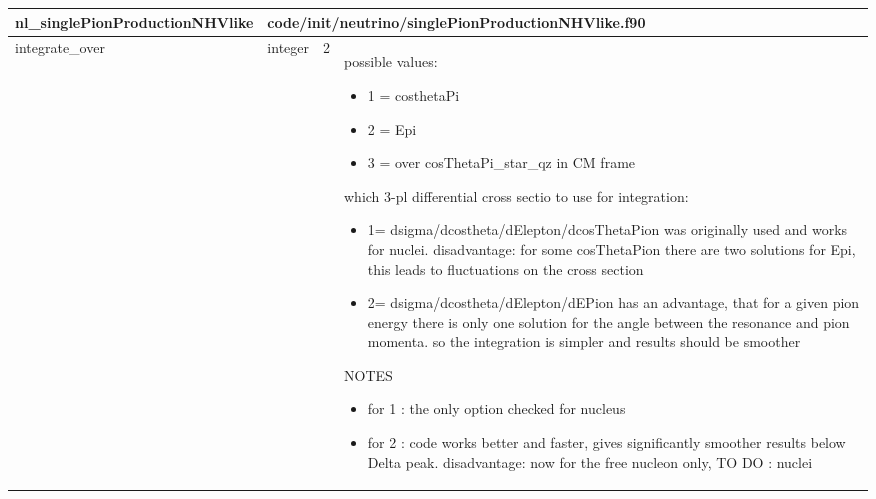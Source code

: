 \documentclass{article}
\begin{document}
\begin{longtable}{llll}
\toprule
\textbf{\large{nl\_singlePionProductionNHVlike}} & \multicolumn{3}{l}{\footnotesize{code/init/neutrino/singlePionProductionNHVlike.f90}}\\*
\midrule
\endfirsthead
\midrule
\endhead
integrate\_over & \begin{minipage}[t]{2cm}integer\end{minipage} & \begin{minipage}[t]{2cm}2\end{minipage} & \begin{minipage}[t]{12cm}possible values:\begin{itemize}\leftmargin0em\itemindent0pt\item 1 = costhetaPi\item 2 = Epi\item 3 = over cosThetaPi\_star\_qz in CM frame\end{itemize} which 3-pl differential cross sectio to use for integration:\begin{itemize}\leftmargin0em\itemindent0pt\item 1= dsigma/dcostheta/dElepton/dcosThetaPion was originally used and   works for nuclei.   disadvantage: for some cosThetaPion there are two solutions for Epi,   this  leads to fluctuations on the cross section\item 2= dsigma/dcostheta/dElepton/dEPion  has an advantage, that for a given pion energy there is   only one solution for  the angle between the resonance and pion momenta.   so the integration is simpler and results should be smoother\end{itemize}NOTES\begin{itemize}\leftmargin0em\itemindent0pt\item for 1 : the only option checked for nucleus\item for 2 : code works better and faster,   gives significantly smoother results below Delta peak.   disadvantage: now for the free nucleon only, TO DO : nuclei\end{itemize}\end{minipage}\\*
\bottomrule
\end{longtable}
{ }



\end{document}
